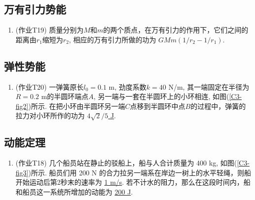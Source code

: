 \subsection{万有引力势能}

\begin{enumerate}
	
	\item (作业T19) 质量分别为$M$和$m$的两个质点，在万有引力的作用下，它们之间的距离由$r_1$缩短为$r_2$, 相应的万有引力所做的功为 \uline{$GMm(1/r_2 - 1/r_1)$}. 
	
\end{enumerate}

\subsection{弹性势能}

\begin{enumerate}
	
	\item (作业T20) 一弹簧原长$l_0 = 0.1$ m, 劲度系数$k = 40$ N/m, 其一端固定在半径为$R = 0.2$ m的半圆环端点$A$, 另一端与一套在半圆环上的小环相连, 如图(\ref{C3-fig2})所示.  在把小环由半圆环另一端$C$点移到半圆环中点$B$的过程中，弹簧的拉力对小环所作的功为 \uline{$4\sqrt{2}/5$ J}. 
	
\end{enumerate}

\subsection{动能定理}

\begin{enumerate}
	
	\item (作业T18) 几个船员站在静止的驳船上，船与人合计质量为 400 kg, 如图(\ref{C3-fig3})所示. 船员们用 200 N 的合力拉另一端系在岸边一树上的水平轻绳，则船开始运动后第2秒末的速率为 \uline{1 m/s}. 若不计水的阻力，那么在这段时间内，船和船员这一系统所增加的动能为 \uline{200 J}.
	
\end{enumerate}

\newpage
